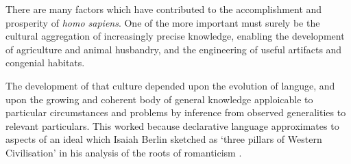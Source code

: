There are many factors which have contributed to the accomplishment and prosperity of \emph{homo sapiens}.
One of the more important must surely be the cultural aggregation of increasingly precise knowledge, enabling the development of agriculture and animal husbandry, and the engineering of useful artifacts and congenial habitats.

The development of that culture depended upon the evolution of languge, and upon the growing and coherent body of general knowledge apploicable to particular circumstances and problems by inference from observed generalities to relevant particulars.
This worked because declarative language approximates to aspects of an ideal which Isaiah Berlin sketched as `three pillars of Western Civilisation' in his analysis of the roots of romanticism \cite{berlinRR}.

